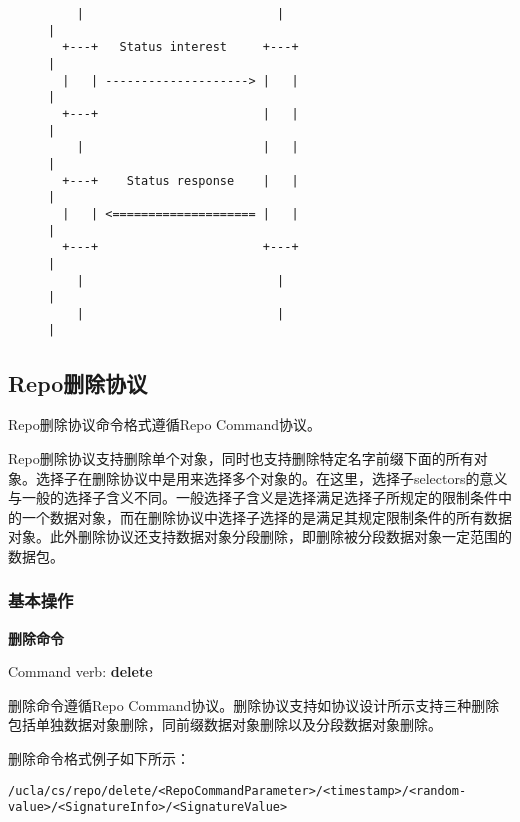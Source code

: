 \begin{figure}[H]
\begin{framed}
\begin{scriptsize}
\begin{verbatim}
    |                           |                                 |
  +---+   Status interest     +---+                               |
  |   | --------------------> |   |                               |
  +---+                       |   |                               |
    |                         |   |                               |
  +---+    Status response    |   |                               |
  |   | <==================== |   |                               |
  +---+                       +---+                               |
    |                           |                                 |
    |                           |                                 |
\end{verbatim}
\end{scriptsize}
\end{framed}
\end{figure}

\subsection{Repo删除协议}
Repo删除协议命令格式遵循Repo Command协议。

Repo删除协议支持删除单个对象，同时也支持删除特定名字前缀下面的所有对象。选择子在删除协议中是用来选择多个对象的。在这里，选择子selectors的意义与一般的选择子含义不同。一般选择子含义是选择满足选择子所规定的限制条件中的一个数据对象，而在删除协议中选择子选择的是满足其规定限制条件的所有数据对象。此外删除协议还支持数据对象分段删除，即删除被分段数据对象一定范围的数据包。

\subsubsection{基本操作}
\textbf{删除命令}

Command verb: \textbf{delete}

删除命令遵循Repo Command协议。删除协议支持如协议设计所示支持三种删除包括单独数据对象删除，同前缀数据对象删除以及分段数据对象删除。

删除命令格式例子如下所示：

\begin{framed}
\begin{scriptsize}
\begin{verbatim}
/ucla/cs/repo/delete/<RepoCommandParameter>/<timestamp>/<random-value>/<SignatureInfo>/<SignatureValue>
\end{verbatim}
\end{scriptsize}
\end{framed}

